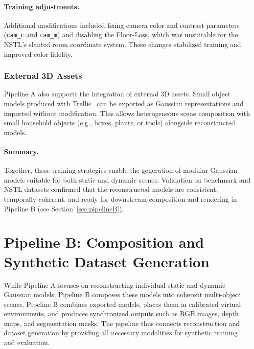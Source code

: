 \paragraph{Training adjustments.} 
Additional modifications included fixing camera color and contrast parameters (\texttt{cam\_c} and \texttt{cam\_m}) and disabling the Floor-Loss, which was unsuitable for the NSTL’s slanted room coordinate system. These changes stabilized training and improved color fidelity.

\subsubsection{External 3D Assets}
Pipeline A also supports the integration of external 3D assets. Small object models produced with Trellis~\cite{xiang2024structured} can be exported as Gaussian representations and imported without modification. 
This allows heterogeneous scene composition with small household objects (e.g., boxes, plants, or tools) alongside reconstructed models.

\paragraph{Summary.} 
Together, these training strategies enable the generation of modular Gaussian models suitable for both static and dynamic scenes. 
Validation on benchmark and NSTL datasets confirmed that the reconstructed models are consistent, temporally coherent, and ready for downstream composition and rendering in Pipeline B (see Section~\ref{sec:pipelineB}).






\section{Pipeline B: Composition and Synthetic Dataset Generation}

While Pipeline A focuses on reconstructing individual static and dynamic Gaussian models, Pipeline B composes these models into coherent multi-object scenes. Pipeline B combines exported models, places them in calibrated virtual environments, and produces synchronized outputs such as RGB images, depth maps, and segmentation masks. The pipeline thus connects reconstruction and dataset generation by providing all necessary modalities for synthetic training and evaluation.

